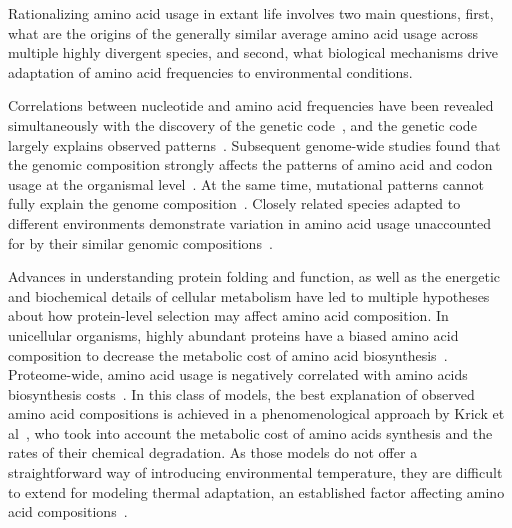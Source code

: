 \documentclass[10pt,letterpaper]{article}
\begin{document}
Rationalizing amino acid usage in extant life involves two main questions, first, what are the origins of the generally similar average amino acid usage across multiple highly divergent species, and second, what biological mechanisms drive adaptation of amino acid frequencies to environmental conditions. 

Correlations between nucleotide and amino acid frequencies have been revealed simultaneously with the discovery of the genetic code~\cite{Sueoka1961Correlation}, and the genetic code largely explains observed patterns~\cite{Jukes1975Amino,King1969NonDarwinian}. Subsequent genome-wide studies found that the genomic composition strongly affects the patterns of amino acid and codon usage at the organismal level~\cite{Kreil2001Identification,Knight2001Simple,Lightfield2011Across,Goncearenco2014Fundamental}. At the same time, mutational patterns cannot fully explain the genome composition~\cite{Rocha2010Mutational}. Closely related species adapted to different environments demonstrate variation in amino acid usage unaccounted for by their similar genomic compositions~\cite{Singer2003Thermophilic,Mcdonald2010Temperature,Haney1999Thermal,Fukuchi2003Unique}. 

Advances in understanding protein folding and function, as well as the energetic and biochemical details of cellular metabolism have led to multiple hypotheses about how protein-level selection may affect amino acid composition. In unicellular organisms, highly abundant proteins have a biased amino acid composition to decrease the metabolic cost of amino acid biosynthesis~\cite{Akashi2002Metabolic,Heizer2006Amino}.  Proteome-wide, amino acid usage is negatively correlated with amino acids biosynthesis costs~\cite{Seligmann2003CostMinimization,Heizer2011Amino}. In this class of models, the best explanation of observed amino acid compositions is achieved in a phenomenological approach by Krick et al~\cite{Krick2014Amino}, who took into account the metabolic cost of amino acids synthesis and the rates of their chemical degradation.  As those models do not offer a straightforward way of introducing environmental temperature, they are difficult to extend for modeling thermal adaptation, an established factor affecting amino acid compositions~\cite{Zeldovich2007Protein,Singer2003Thermophilic,Kreil2001Identification,Haney1999Thermal}.
\end{document}
